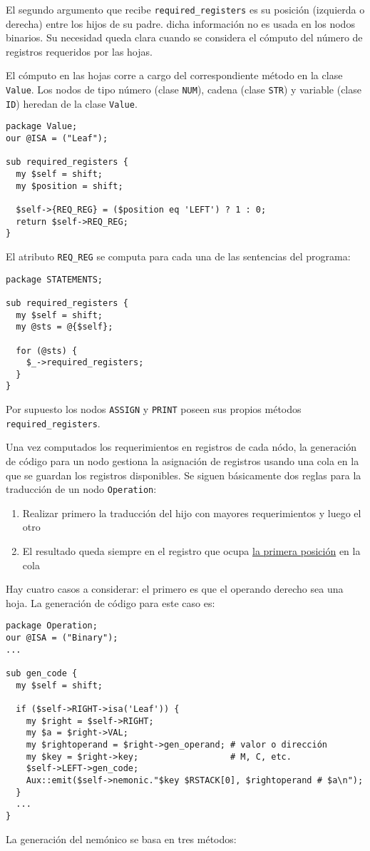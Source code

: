 El segundo argumento que recibe \verb|required_registers| es 
su posición (izquierda o derecha) entre los hijos de su padre.
dicha información no es usada en los nodos binarios. 
Su necesidad queda clara cuando se considera el cómputo
del número de registros requeridos por las hojas.

El cómputo en las hojas corre a cargo del correspondiente método
en la clase \verb|Value|. Los nodos de tipo número (clase \verb|NUM|), cadena 
(clase \verb|STR|) y variable (clase \verb|ID|)
heredan de la clase \verb|Value|.

\begin{verbatim}
package Value;
our @ISA = ("Leaf");

sub required_registers {
  my $self = shift;
  my $position = shift;

  $self->{REQ_REG} = ($position eq 'LEFT') ? 1 : 0;
  return $self->REQ_REG;
}
\end{verbatim}

El atributo \verb|REQ_REG| se computa para cada una de las sentencias 
del programa:

\begin{verbatim}
package STATEMENTS;

sub required_registers {
  my $self = shift;
  my @sts = @{$self};

  for (@sts) {
    $_->required_registers;
  }
}
\end{verbatim}

Por supuesto los nodos \verb|ASSIGN| y \verb|PRINT|
poseen sus propios métodos \verb|required_registers|.

Una vez computados los requerimientos en registros de cada
nódo, la generación de código para un nodo gestiona la
asignación de registros usando una cola en la que se guardan 
los registros disponibles. Se
siguen básicamente dos reglas para la traducción de un
nodo  \verb|Operation|:

\begin{enumerate}
\item
Realizar primero la traducción del hijo con mayores
requerimientos y luego el otro
\item
El resultado queda siempre en el registro que ocupa 
\underline{la primera posición} en la cola
\end{enumerate}

Hay cuatro casos a considerar: el primero 
es que el operando derecho sea una hoja.
La generación de código para este caso es:

\begin{verbatim}
package Operation;
our @ISA = ("Binary");
...

sub gen_code {
  my $self = shift;

  if ($self->RIGHT->isa('Leaf')) {
    my $right = $self->RIGHT;
    my $a = $right->VAL;
    my $rightoperand = $right->gen_operand; # valor o dirección 
    my $key = $right->key;                  # M, C, etc.
    $self->LEFT->gen_code;
    Aux::emit($self->nemonic."$key $RSTACK[0], $rightoperand # $a\n");
  }
  ...
}
\end{verbatim}
La generación del nemónico se basa en tres métodos:

